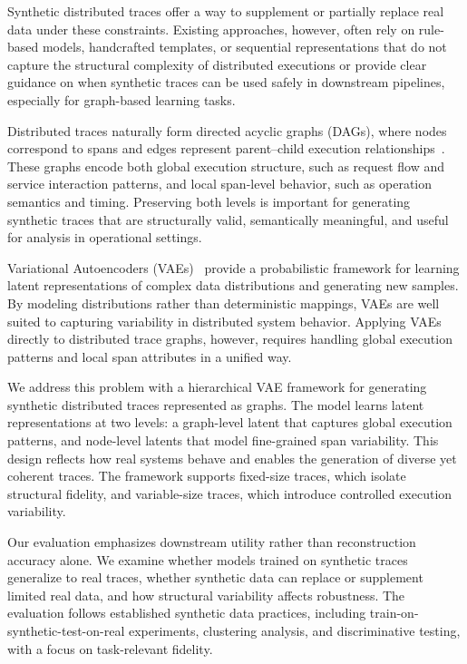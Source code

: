 \documentclass[sigconf,review]{acmart}
\begin{document}
Synthetic distributed traces offer a way to supplement or partially replace real data under these constraints. Existing approaches, however, often rely on rule-based models, handcrafted templates, or sequential representations that do not capture the structural complexity of distributed executions or provide clear guidance on when synthetic traces can be used safely in downstream pipelines, especially for graph-based learning tasks.

Distributed traces naturally form directed acyclic graphs (DAGs), where nodes correspond to spans and edges represent parent--child execution relationships~\cite{sigelman2010dapper}. These graphs encode both global execution structure, such as request flow and service interaction patterns, and local span-level behavior, such as operation semantics and timing. Preserving both levels is important for generating synthetic traces that are structurally valid, semantically meaningful, and useful for analysis in operational settings.

Variational Autoencoders (VAEs)~\cite{kingma2013auto,hamilton2020graph} provide a probabilistic framework for learning latent representations of complex data distributions and generating new samples. By modeling distributions rather than deterministic mappings, VAEs are well suited to capturing variability in distributed system behavior. Applying VAEs directly to distributed trace graphs, however, requires handling global execution patterns and local span attributes in a unified way.

We address this problem with a hierarchical VAE framework for generating synthetic distributed traces represented as graphs. The model learns latent representations at two levels: a graph-level latent that captures global execution patterns, and node-level latents that model fine-grained span variability. This design reflects how real systems behave and enables the generation of diverse yet coherent traces. The framework supports fixed-size traces, which isolate structural fidelity, and variable-size traces, which introduce controlled execution variability.

Our evaluation emphasizes downstream utility rather than reconstruction accuracy alone. We examine whether models trained on synthetic traces generalize to real traces, whether synthetic data can replace or supplement limited real data, and how structural variability affects robustness. The evaluation follows established synthetic data practices, including train-on-synthetic-test-on-real experiments, clustering analysis, and discriminative testing, with a focus on task-relevant fidelity.
\end{document}
